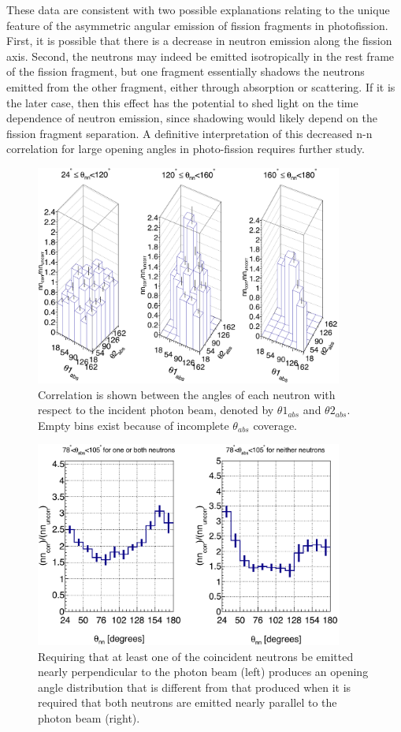 These data are consistent with two possible explanations relating to the unique feature of the asymmetric angular emission of fission fragments in photofission.
First, it is possible that there is a decrease in neutron emission along the fission axis.
Second, the neutrons may indeed be emitted isotropically in the rest frame of the fission fragment, but one fragment essentially shadows the neutrons emitted from the other fragment, either through absorption or scattering.
If it is the later case, then this effect has the potential to shed light on the time dependence of neutron emission, since shadowing would likely depend on the fission fragment separation.
A definitive interpretation of this decreased n-n correlation for large opening angles in photo-fission requires further study.

\begin{figure}
\centering
    \includegraphics[width = 0.9\textwidth]{Content/Results/theta_abs_LEGO.png}
    \caption{Correlation is shown between the angles of each neutron with respect to the incident photon beam, denoted by $\theta 1_{abs}$ and $\theta 2_{abs}$.
    Empty bins exist because of incomplete $\theta_{abs}$ coverage.}
    \label{fig:theta_abs_LEGO}
\end{figure}
\begin{figure}
\centering
\includegraphics[width=0.9\textwidth]{Content/Results/theta_abs_two-neutron.png}
\caption{Requiring that at least one of the coincident neutrons be emitted nearly perpendicular to the photon beam (left) produces an opening angle distribution that is different from that produced when it is required that both neutrons are emitted nearly parallel to the photon beam (right).}
\label{fig:theta_abs_two_neutron}
\end{figure}
